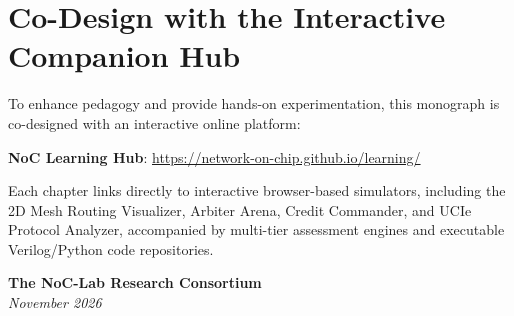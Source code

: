 \section*{Co-Design with the Interactive Companion Hub}
To enhance pedagogy and provide hands-on experimentation, this monograph is co-designed with an interactive online platform:
\begin{center}
\textbf{NoC Learning Hub}: \url{https://network-on-chip.github.io/learning/}
\end{center}
Each chapter links directly to interactive browser-based simulators, including the 2D Mesh Routing Visualizer, Arbiter Arena, Credit Commander, and UCIe Protocol Analyzer, accompanied by multi-tier assessment engines and executable Verilog/Python code repositories.

\vspace{1cm}
\begin{flushright}
\textbf{The NoC-Lab Research Consortium}\\
\emph{November 2026}
\end{flushright}
